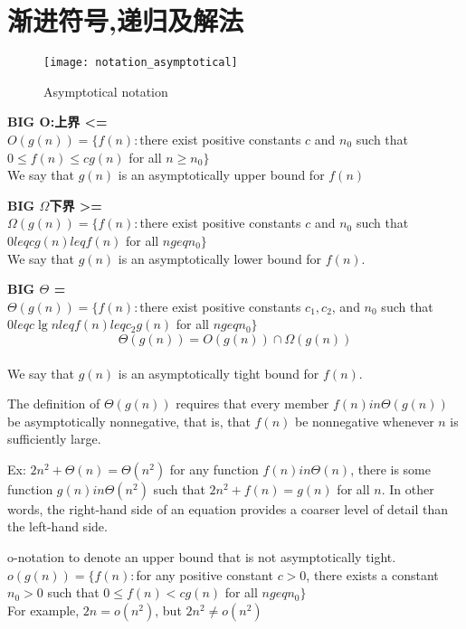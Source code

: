 \documentclass{article}
\begin{document}
\section{渐进符号,递归及解法}
\begin{definition}
\begin{figure}[htbp]
  \centering
  \texttt{[image: notation\_asymptotical]}\\
  \caption{Asymptotical notation}\label{fig.notation.asymptotical}
\end{figure}
\textbf{BIG O:上界 <=}\\
$O(g(n)) = \{f(n): $there exist positive constants $c$ and $n_0$ such that $0 \leq f(n) \leq cg(n)$ for all $n \geq n_0\}$\\
We say that $g(n)$ is an asymptotically upper bound for $f(n)$

\textbf{BIG $\Omega$下界 >=}\\
$\Omega(g(n)) = \{f(n): $there exist positive constants $c$ and $n_0$ such that $0 leq cg(n) leq f(n)$ for all $n geq n_0\}$\\
We say that $g(n)$ is an asymptotically lower bound for $f(n)$.

\textbf{BIG $\Theta$ =}\\
$\Theta(g(n)) = \{f(n) : $there exist positive constants $c_1, c_2$, and $n_0$ such that $0 leq c\lg n leq f(n) leq c_2g(n)$ for all $n geq n_0\}$\\
$$\Theta(g(n))=O(g(n)) \cap \Omega(g(n)) $$\\
We say that $g(n)$ is an asymptotically tight bound for $f(n)$.

The definition of $\Theta(g(n))$ requires that every member $f(n) in \Theta(g(n))$ be asymptotically nonnegative, that is, that $f(n)$ be nonnegative whenever $n$ is sufficiently large.
\end{definition}

Ex:
$2n^2 + \Theta(n) = \Theta(n^2)$
for any function $f(n) in \Theta(n)$, there is some function $g(n) in \Theta(n^2)$ such that $2n^2 + f(n) = g(n)$ for all $n$. In other words, the right-hand side of an equation provides a coarser level of detail than the left-hand side.

o-notation
to denote an upper bound that is not asymptotically tight.\\
$o(g(n)) = \{f(n) : $for any positive constant $c > 0$, there exists a constant $n_0 > 0$ such that $0 \leq f(n) < cg(n)$ for all $n geq n_0\}$\\
For example, $2n = o(n^2)$, but $2n^2 \neq o(n^2)$
\end{document}
